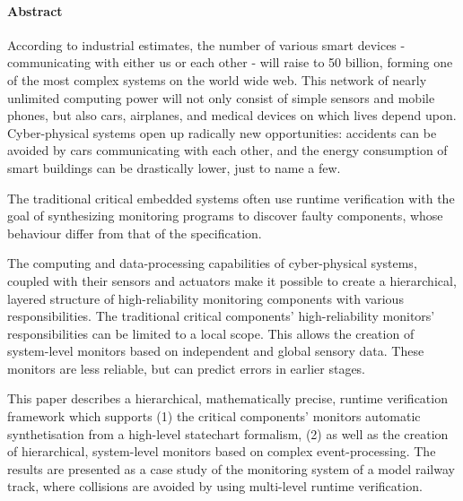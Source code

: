 \newpage

\thispagestyle{plain}
\paragraph*{Abstract}

According to industrial estimates, the number of various smart devices - communicating with either us or each other - will raise to 50 billion, forming one of the most complex systems on the world wide web. This network of nearly unlimited computing power will not only consist of simple sensors and mobile phones, but also cars, airplanes, and medical devices on which lives depend upon. Cyber-physical systems open up radically new opportunities: accidents can be avoided by cars communicating with each other, and the energy consumption of smart buildings can be drastically lower, just to name a few.

The traditional critical embedded systems often use runtime verification with the goal of synthesizing monitoring programs to discover faulty components, whose behaviour differ from that of the specification.

The computing and data-processing capabilities of cyber-physical systems, coupled with their sensors and actuators make it possible to create a hierarchical, layered structure of high-reliability monitoring components with various responsibilities. The traditional critical components' high-reliability monitors' responsibilities can be limited to a local scope. This allows the creation of system-level monitors based on independent and global sensory data. These monitors are less reliable, but can predict errors in earlier stages.

This paper describes a hierarchical, mathematically precise, runtime verification framework which supports (1) the critical components' monitors automatic synthetisation from a high-level statechart formalism, (2) as well as the creation of hierarchical, system-level monitors based on complex event-processing. The results are presented as a case study of the monitoring system of a model railway track, where collisions are avoided by using multi-level runtime verification.